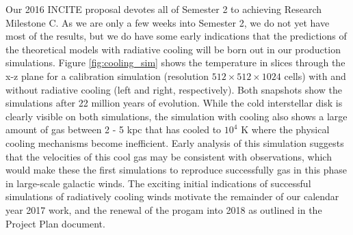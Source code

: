 \documentclass[11pt,letterpaper,english]{article}
\begin{document}
Our 2016 INCITE proposal devotes all of Semester 2 to achieving Research Milestone C. As we are only a few weeks into Semester 2, we do not yet have most of the results, but we do have some early indications that the predictions of the theoretical models with radiative cooling will be born out in our production simulations. Figure \ref{fig:cooling_sim} shows the temperature in slices through the x-z plane for a calibration simulation (resolution $512\times512\times1024$ cells) with and without radiative cooling (left and right, respectively). Both snapshots show the simulations after 22 million years of evolution. While the cold interstellar disk is clearly visible on both simulations, the simulation with cooling also shows a large amount of gas between 2 - 5 kpc that has cooled to $10^4$ K where the physical cooling mechanisms
become inefficient. Early analysis of this simulation suggests that the velocities of this cool gas may be consistent with observations, which would make these the first simulations to reproduce successfully gas in this phase in large-scale galactic winds. The exciting initial indications of successful simulations of
radiatively cooling winds motivate the remainder of our calendar year 2017 work, and the renewal of the
progam into 2018 as outlined in the Project Plan document.
\end{document}
